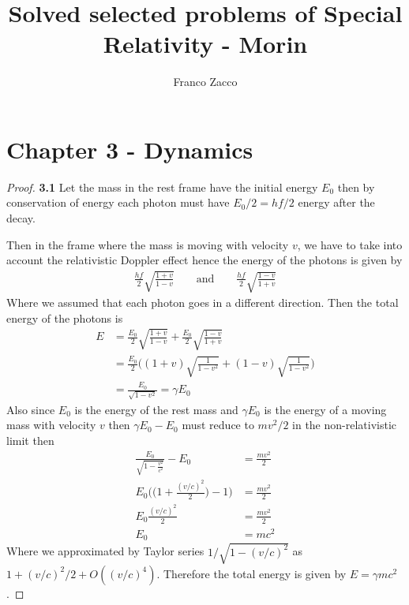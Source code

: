 \documentclass[11pt]{article}
\title{\textbf{Solved selected problems of Special Relativity - Morin}}
\author{Franco Zacco}
\date{}
\theoremstyle{definition}
\begin{document}
\maketitle
\thispagestyle{empty}

\section*{Chapter 3 - Dynamics}

\begin{proof}{\textbf{3.1}}
    Let the mass in the rest frame have the initial energy $E_0$ then by
    conservation of energy each photon must have $E_0/2 = hf/2$ energy
    after the decay.
    
    Then in the frame where the mass is moving with velocity $v$, we have
    to take into account the relativistic Doppler effect hence the energy
    of the photons is given by
    \begin{align*}
        \frac{hf}{2}\sqrt{\frac{1+ v}{1-v}}
        \qquad\text{and}\qquad
        \frac{hf}{2}\sqrt{\frac{1 -v}{1 +v}}
    \end{align*}
    Where we assumed that each photon goes in a different direction.
    Then the total energy of the photons is
    \begin{align*}
        E &= \frac{E_0}{2}\sqrt{\frac{1+ v}{1-v}}
        + \frac{E_0}{2}\sqrt{\frac{1 -v}{1 +v}}\\
        &= \frac{E_0}{2}\bigg((1+v)\sqrt{\frac{1}{1-v^2}} 
        + (1-v)\sqrt{\frac{1}{1 -v^2}}\bigg)\\
        &= \frac{E_0}{\sqrt{1-v^2}} = \gamma E_0
    \end{align*}
    Also since $E_0$ is the energy of the rest mass and $\gamma E_0$ is
    the energy of a moving mass with velocity $v$ then $\gamma E_0 - E_0$
    must reduce to $mv^2/2$ in the non-relativistic limit then
    \begin{align*}
        \frac{E_0}{\sqrt{1-\frac{v^2}{c^2}}} - E_0 &= \frac{mv^2}{2}\\
        E_0\bigg(\bigg(1 + \frac{(v/c)^2}{2}\bigg) - 1\bigg) &= \frac{mv^2}{2}\\
        E_0\frac{(v/c)^2}{2} &= \frac{mv^2}{2}\\
        E_0 &= mc^2
    \end{align*}
    Where we approximated by Taylor series $1/\sqrt{1 - (v/c)^2}$ as 
    $1 + (v/c)^2/2 + O((v/c)^4)$. Therefore the total energy is given by
    $E = \gamma mc^2$.


\end{proof}
\end{document}
